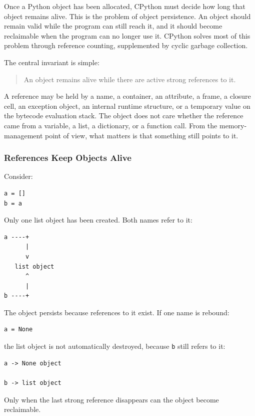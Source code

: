 Once a Python object has been allocated, CPython must decide how long that object remains alive. This is the problem of object persistence. An object should remain valid while the program can still reach it, and it should become reclaimable when the program can no longer use it. CPython solves most of this problem through reference counting, supplemented by cyclic garbage collection.

The central invariant is simple:

\begin{quote}
An object remains alive while there are active strong references to it.
\end{quote}

A reference may be held by a name, a container, an attribute, a frame, a closure cell, an exception object, an internal runtime structure, or a temporary value on the bytecode evaluation stack. The object does not care whether the reference came from a variable, a list, a dictionary, or a function call. From the memory-management point of view, what matters is that something still points to it.

\subsubsection*{References Keep Objects Alive}

Consider:

\begin{verbatim}
a = []
b = a
\end{verbatim}

Only one list object has been created. Both names refer to it:

\begin{verbatim}
a ----+
      |
      v
   list object
      ^
      |
b ----+
\end{verbatim}

The object persists because references to it exist. If one name is rebound:

\begin{verbatim}
a = None
\end{verbatim}

the list object is not automatically destroyed, because \texttt{b} still refers to it:

\begin{verbatim}
a -> None object

b -> list object
\end{verbatim}

Only when the last strong reference disappears can the object become reclaimable.

